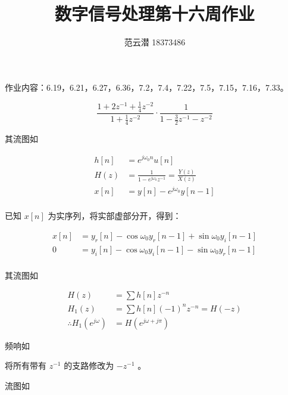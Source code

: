 \documentclass[lang=cn,11pt,a4paper,cite=authoryear,twocolumn]{elegantpaper}
\title{数字信号处理\quad 第十六周作业}
\author{范云潜 18373486}
\institute{微电子学院 184111 班}
\date{\zhtoday}
\begin{document}
\maketitle

作业内容：6.19，6.21，6.27，6.36，7.2，7.4，7.22，7.5，7.15，7.16，7.33。



\[\frac{1 + 2 z^{-1} + \frac{1}{4} z^{-2}}{1 + \frac{1}{4}z^{-2}} \cdot \frac{1}{1 - \frac{3}{2}z^{-1} - z^{-2}} \]

其流图如



\[\begin{aligned}
    h[n] &= e^{j\omega_0 n} u[n] \\ 
    H(z) &= \frac{1}{1-e^{j\omega_0} z^{-1}} = \frac{Y(z)}{X(z)}\\ 
    x[n] &= y[n] - e^{j\omega_0} y[n-1] \\ 
\end{aligned}\]

已知 \(x[n]\) 为实序列，将实部虚部分开，得到：

\[\begin{aligned}
    x[n] &= y_r[n] - \cos \omega_0 y_r[n-1] + \sin \omega_0 y_i[n-1]\\
     0 &= y_i[n] - \cos \omega_0 y_i[n-1] - \sin \omega_0 y_r[n-1]\\
\end{aligned}\]

其流图如




\[\begin{aligned}
    H(z) &= \sum h[n] z^{-n} \\ 
    H_1(z) &= \sum h[n] (-1)^n z^{-n} = H(-z) \\
    \therefore H_1(e^{j\omega}) &= H(e^{j\omega + j\pi})
\end{aligned}\]

频响如




将所有带有 \(z^{-1}\) 的支路修改为 \(-z^{-1}\) 。


流图如

\end{document}
